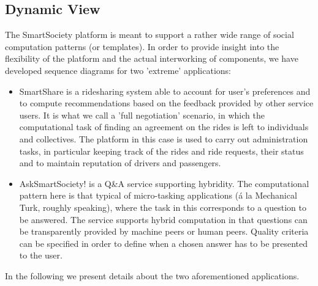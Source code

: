 \subsection{Dynamic View}
The SmartSociety platform is meant to support a rather wide range of
social computation patterns (or templates). In order to provide
insight into the flexibility of the platform and the actual
interworking of components, we have developed sequence diagrams for two
'extreme' applications:
\begin{itemize}
\item SmartShare is a ridesharing system able to account for user's
preferences and to compute recommendations based on the feedback
provided by other service users. It is what we call a 'full
negotiation' scenario, in which the computational task of finding an
agreement on the rides is left to individuals and collectives. The
platform in this case is used to carry out administration tasks, in
particular keeping track of the rides and ride requests, their status
and to maintain reputation of drivers and passengers.
\item AskSmartSociety! is a Q\&A service supporting hybridity. The
computational pattern here is that typical of micro-tasking
applications (\'a la Mechanical Turk, roughly speaking), where the
task in this corresponds to a question to be answered. The service
supports hybrid computation in that questions can be transparently
provided by machine peers or human peers. Quality criteria can be
specified in order to define when a chosen answer has to be presented
to the user. 
\end{itemize}
In the following we present details about the two aforementioned
applications. 
